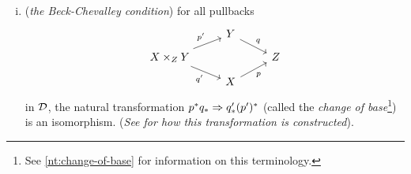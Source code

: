 \begin{definition}
\begin{enumerate}[(i)]
                \item (\emph{the Beck-Chevalley condition}) for all pullbacks
                    \begin{equation*}
                        \begin{tikzcd}[row sep=.7em]
                             & Y \arrow[dr, "q"] &\\
                            X\times_Z Y \arrow[ur, "p'"] \arrow[dr, swap, "q'"] & & Z\\
                             & X \arrow[ur, swap, "p"] &
                        \end{tikzcd}
                    \end{equation*}
                    in $\mathcal{D}$, the natural transformation $p^*q_*\Rightarrow q'_*(p')^*$ (called the \emph{change of base}\footnote{
                        See \cref{nt:change-of-base} for information on this terminology.
                    }) is an isomorphism.
                    (\emph{See \cite[\S2,~\P3]{Toen:2005wxa} for how this transformation is constructed}).\qedhere
            \end{enumerate}
        \end{definition}



